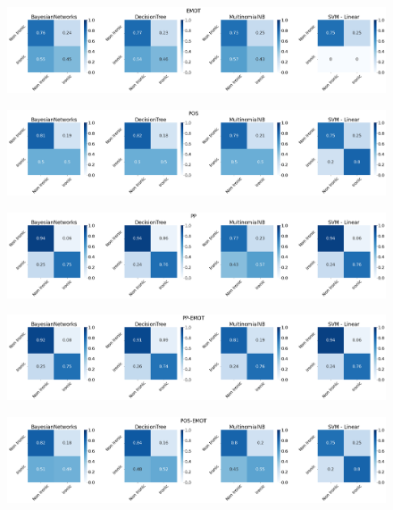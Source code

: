 \documentclass[oneside]{book}
\begin{document}
\begin{figure}[H]
	\centering
	\includegraphics[width=13cm]{assets/reports/conf-matrix/nobow/emot.png}
\end{figure}
\vspace*{-0.8cm}

\begin{figure}[H]
	\centering
	\includegraphics[width=13cm]{assets/reports/conf-matrix/nobow/pos.png}
\end{figure}
\vspace*{-0.8cm}

\begin{figure}[H]
	\centering
	\includegraphics[width=13cm]{assets/reports/conf-matrix/nobow/pp.png}
\end{figure}
\vspace*{-0.8cm}

\begin{figure}[H]
	\centering
	\includegraphics[width=13cm]{assets/reports/conf-matrix/nobow/pp-emot.png}
\end{figure}
\vspace*{-0.8cm}

\begin{figure}[H]
	\centering
	\includegraphics[width=13cm]{assets/reports/conf-matrix/nobow/pos-emot.png}
\end{figure}
\vspace*{-0.8cm}
\end{document}
